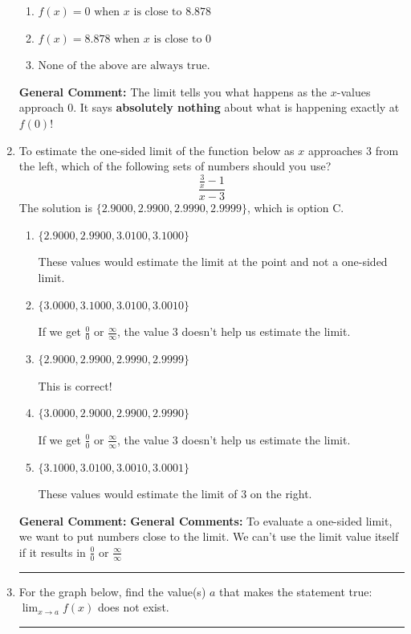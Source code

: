 \documentclass{extbook}[14pt]
\newcommand{\litem}[1]{\item #1

\rule{\textwidth}{0.4pt}}
\begin{document}
\begin{enumerate}
{\begin{enumerate}[label=\Alph*.]
\item \( f(x) = 0 \text{ when } x \text{ is close to } 8.878 \)


\item \( f(x) = 8.878 \text{ when } x \text{ is close to } 0 \)


\item \( \text{None of the above are always true.} \)


\end{enumerate}

\textbf{General Comment:} The limit tells you what happens as the $x$-values approach $0$. It says \textbf{absolutely nothing} about what is happening exactly at $f(0)$!
}
\litem{
To estimate the one-sided limit of the function below as $x$ approaches 3 from the left, which of the following sets of numbers should you use?
\[ \frac{\frac{3}{x} - 1}{x - 3} \]The solution is \( \{ 2.9000, 2.9900, 2.9990, 2.9999 \} \), which is option C.\begin{enumerate}[label=\Alph*.]
\item \( \{ 2.9000, 2.9900, 3.0100, 3.1000 \} \)

These values would estimate the limit at the point and not a one-sided limit.
\item \( \{ 3.0000, 3.1000, 3.0100, 3.0010 \} \)

If we get $\frac{0}{0}$ or $\frac{\infty}{\infty}$, the value 3 doesn't help us estimate the limit.
\item \( \{ 2.9000, 2.9900, 2.9990, 2.9999 \} \)

This is correct!
\item \( \{ 3.0000, 2.9000, 2.9900, 2.9990 \} \)

If we get $\frac{0}{0}$ or $\frac{\infty}{\infty}$, the value 3 doesn't help us estimate the limit.
\item \( \{ 3.1000, 3.0100, 3.0010, 3.0001 \} \)

These values would estimate the limit of 3 on the right.
\end{enumerate}

\textbf{General Comment:} \textbf{General Comments:} To evaluate a one-sided limit, we want to put numbers close to the limit. We can't use the limit value itself if it results in $\frac{0}{0}$ or $\frac{\infty}{\infty}$
}
\litem{
For the graph below, find the value(s) $a$ that makes the statement true: $ \displaystyle \lim_{x \rightarrow a} f(x)$ does not exist.

}
\end{enumerate}
\end{document}

